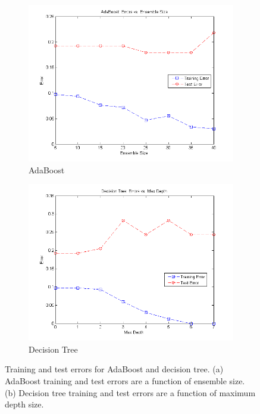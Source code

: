 \documentclass{article} %
\begin{document}
\begin{figure}
\centering
 \begin{subfigure}{.5\textwidth}
  \centering
  \includegraphics[width=1\linewidth]{img/boost_errors.png}
  \caption{AdaBoost}
  \label{fig:adaboost_errors}
 \end{subfigure}%
 \begin{subfigure}{.5\textwidth}
  \centering
  \includegraphics[width=1\linewidth]{img/tree_errors.png}
  \caption{Decision Tree}
  \label{fig:tree_errors}
 \end{subfigure}
\caption{Training and test errors for AdaBoost and decision tree. (a) AdaBoost training and test errors are a function of ensemble size. (b) Decision tree training and test errors are a function of maximum depth size.}
\label{fig:errors}
\end{figure}
\end{document}

